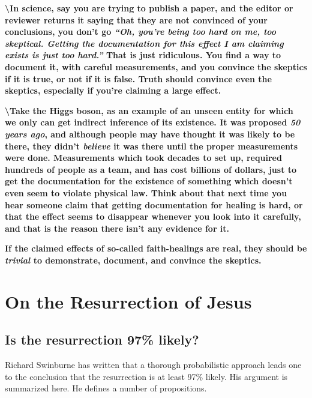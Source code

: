 \documentclass{tufte-book}
\begin{document}
\textbf{\textbackslash{}In science, say you are trying to publish a
paper, and the editor or reviewer returns it saying that they are not
convinced of your conclusions, you don't go
\emph{``Oh, you're being too hard on me, too
skeptical. Getting the documentation for this effect I am claiming
exists is just too hard.''} That is just ridiculous. You find a way to
document it, with careful measurements, and you convince the skeptics if
it is true, or not if it is false. Truth should convince even the
skeptics, especially if you're claiming a large effect.}

\textbf{\textbackslash{}Take the Higgs boson, as an example of an unseen
entity for which we only can get indirect inference of its existence. It
was proposed \emph{50 years ago}, and although people may have thought
it was likely to be there, they didn't \emph{believe} it was there until
the proper measurements were done. Measurements which took decades to
set up, required hundreds of people as a team, and has cost billions of
dollars, just to get the documentation for the existence of something
which doesn't even seem to violate physical law. Think about that next
time you hear someone claim that getting documentation for healing is
hard, or that the effect seems to disappear whenever you look into it
carefully, and that is the reason there isn't any evidence for it.}

\textbf{If the claimed effects of so-called faith-healings are real,
they should be \emph{trivial} to demonstrate, document, and convince the
skeptics.}

\chapter{On the Resurrection of
Jesus}\label{on-the-resurrection-of-jesus}

\section{Is the resurrection 97\%
likely?}\label{is-the-resurrection-97-likely}

Richard Swinburne has
written\citep{swinburne2004existence}\citep{swinburne2003resurrection}
that a thorough probabilistic approach leads one to the conclusion that
the resurrection is at least 97\% likely. His argument is summarized
here. He defines a number of propositions.
\end{document}

